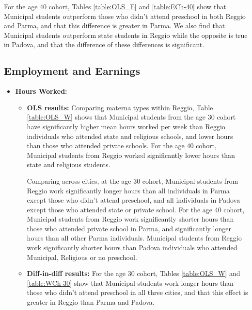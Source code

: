 \documentclass[11pt]{article}
\begin{document}
\begin{itemize}
\begin{itemize}
For the age 40 cohort, Tables \ref{table:OLS_E} and \ref{table:ECh-40} show that Municipal students outperform those who didn't attend preschool in both Reggio and Parma, and that this difference is greater in Parma. We also find that Municipal students outperform state students in Reggio while the opposite is true in Padova, and that the difference of these differences is significant. 

	\end{itemize}

\end{itemize}

\subsection{Employment and Earnings}

\begin{itemize}

\item \textbf{Hours Worked:} 
	\begin{itemize}
	\item \textbf{OLS results:}
Comparing materna types within Reggio, Table \ref{table:OLS_W} shows that Municipal students from the age 30 cohort have significantly higher mean hours worked per week than Reggio individuals who attended state and religious schools, and lower hours than those who attended private schools. For the age 40 cohort, Municipal students from Reggio worked significantly lower hours than state and religious students.

	Comparing across cities, at the age 30 cohort, Municipal students from Reggio work significantly longer hours than all individuals in Parma except those who didn't attend preschool, and all individuals in Padova except those who attended state or private school. For the age 40 cohort,  Municipal students from Reggio work significantly shorter hours than those who attended private school in Parma, and significantly longer hours than all other Parma individuals. Municipal students from Reggio work significantly shorter hours than Padova individuals who attended Municipal, Religious or no preschool.

	\item \textbf{Diff-in-diff results:} For the age 30 cohort, Tables \ref{table:OLS_W} and \ref{table:WCh-30} show that Municipal students work longer hours than those who didn't attend preschool in all three cities, and that this effect is greater in Reggio than Parma and Padova. 


\end{itemize}
\end{itemize}
\end{document}

